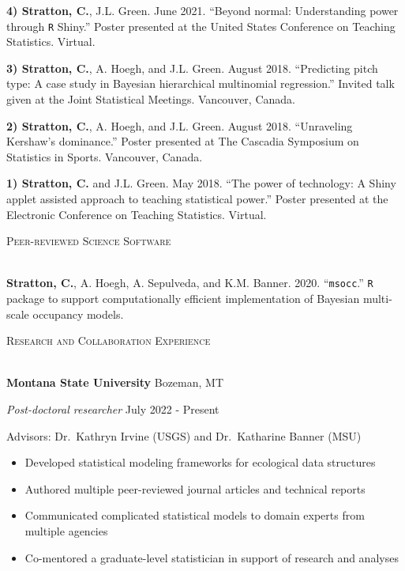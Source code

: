 \documentclass[a4paper]{article}
\newcommand{\lineunder} {
	\vspace*{-8pt} \\
	\hspace*{-18pt} \hrulefill \\
}
\newcommand{\header} [1] {
	{\hspace*{-18pt}\vspace*{6pt} \textsc{#1}}
	\vspace*{-6pt} \lineunder
}
\begin{document}
\textbf{4) Stratton, C.}, J.L. Green. June 2021. ``Beyond normal:
Understanding power through \texttt{R} Shiny.'' Poster presented at the
United States Conference on Teaching Statistics. Virtual. \vspace*{2mm}

\textbf{3) Stratton, C.}, A. Hoegh, and J.L. Green. August 2018.
``Predicting pitch type: A case study in Bayesian hierarchical
multinomial regression.'' Invited talk given at the Joint Statistical
Meetings. Vancouver, Canada. \vspace*{2mm}

\textbf{2) Stratton, C.}, A. Hoegh, and J.L. Green. August 2018.
``Unraveling Kershaw's dominance.'' Poster presented at The Cascadia
Symposium on Statistics in Sports. Vancouver, Canada. \vspace*{2mm}

\textbf{1) Stratton, C.} and J.L. Green. May 2018. ``The power of
technology: A Shiny applet assisted approach to teaching statistical
power.'' Poster presented at the Electronic Conference on Teaching
Statistics. Virtual. \vspace*{2mm}

\header{Peer-reviewed Science Software}
\vspace*{2mm}

\textbf{Stratton, C.}, A. Hoegh, A. Sepulveda, and K.M. Banner. 2020.
``\texttt{msocc}.'' \texttt{R} package to support computationally
efficient implementation of Bayesian multi-scale occupancy models.
\vspace*{2mm}

\header{Research and Collaboration Experience}
\vspace*{2mm}

\textbf{Montana State University} \hfill Bozeman, MT

\textit{Post-doctoral researcher} \hfill July 2022 - Present

Advisors: Dr.~Kathryn Irvine (USGS) and Dr.~Katharine Banner (MSU)

\vspace{-1mm}
\begin{itemize} \itemsep 1pt
    \item Developed statistical modeling frameworks for ecological data structures
    \item Authored multiple peer-reviewed journal articles and technical reports
    \item Communicated complicated statistical models to domain experts from multiple agencies
    \item Co-mentored a graduate-level statistician in support of research and analyses
\end{itemize}
\end{document}
